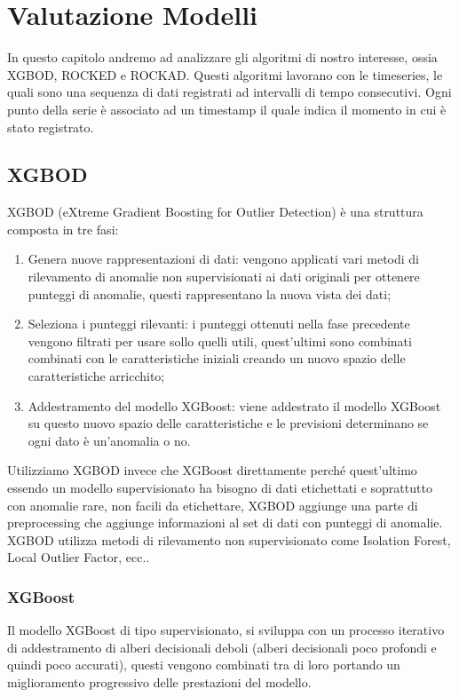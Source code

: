 \chapter{Valutazione Modelli}
In questo capitolo andremo ad analizzare gli algoritmi di nostro interesse, ossia XGBOD, ROCKED e ROCKAD.
Questi algoritmi lavorano con le timeseries, le quali sono una sequenza di dati registrati ad intervalli di tempo consecutivi. Ogni punto della serie è associato ad un timestamp il quale indica il momento in cui è stato registrato.

\section{XGBOD}
XGBOD (eXtreme Gradient Boosting for Outlier Detection) è una struttura composta in tre fasi:
\begin{enumerate}
    \item Genera nuove rappresentazioni di dati: vengono applicati vari metodi di rilevamento di anomalie non supervisionati ai dati originali per ottenere punteggi di anomalie, questi rappresentano la nuova vista dei dati;
    \item Seleziona i punteggi rilevanti: i punteggi ottenuti nella fase precedente vengono filtrati per usare sollo quelli utili, quest'ultimi sono combinati combinati con le caratteristiche iniziali creando un nuovo spazio delle caratteristiche arricchito;
    \item Addestramento del modello XGBoost: viene addestrato il modello XGBoost su questo nuovo spazio delle caratteristiche e le previsioni determinano se ogni dato è un'anomalia o no.
\end{enumerate}
Utilizziamo XGBOD invece che XGBoost direttamente perché quest'ultimo essendo un modello supervisionato ha bisogno di dati etichettati e soprattutto con anomalie rare, non facili da etichettare, XGBOD aggiunge una parte di preprocessing che aggiunge informazioni al set di dati con punteggi di anomalie.
XGBOD utilizza metodi di rilevamento non supervisionato come Isolation Forest, Local Outlier Factor, ecc..

\subsection{XGBoost}
Il modello XGBoost di tipo supervisionato, si sviluppa con un processo iterativo di addestramento di alberi decisionali deboli (alberi decisionali poco profondi e quindi poco accurati), questi vengono combinati tra di loro portando un miglioramento progressivo delle prestazioni del modello.

